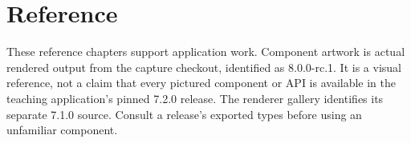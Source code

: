 \clearpage
\part*{Reference}\label{part-atlas}
\setcounter{chapter}{0}
\renewcommand{\thechapter}{\Alph{chapter}}
\renewcommand{\theHchapter}{reference.\arabic{chapter}}

These reference chapters support application work. Component artwork is actual rendered output from the capture checkout, identified as 8.0.0-rc.1. It is a visual reference, not a claim that every pictured component or API is available in the teaching application's pinned 7.2.0 release. The renderer gallery identifies its separate 7.1.0 source. Consult a release's exported types before using an unfamiliar component.

%
%
%
\ifBookTeaching\fi%

\ifBookTeaching
%
%
\fi
